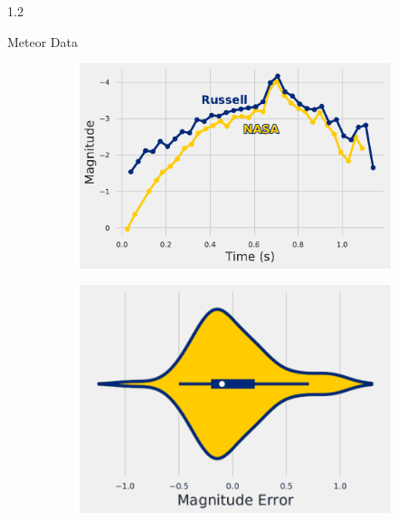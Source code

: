 \documentclass[final]{beamer}
\newlength{\twocolwid}
\begin{document}
\begin{frame}[t]
\begin{columns}[t]
\begin{column}{1.2\twocolwid}
\begin{alertblock}{Meteor Data}
\begin{figure}
\centering
\begin{subfigure}{.52\textwidth}
  \centering
  \includegraphics[width=\linewidth]{PosterGraph.pdf}
  \label{fig:sub1}
\end{subfigure}%
\begin{subfigure}{.48\textwidth}
  \centering
  \includegraphics[width=\linewidth]{PosterViolinPlotBlue.pdf}
  \label{fig:sub2}
\end{subfigure}
\label{fig:test}
\end{figure}
\vspace{-1.5cm}
\end{alertblock}

\vspace{-1cm}


\end{column}
\end{columns}
\end{frame}
\end{document}
